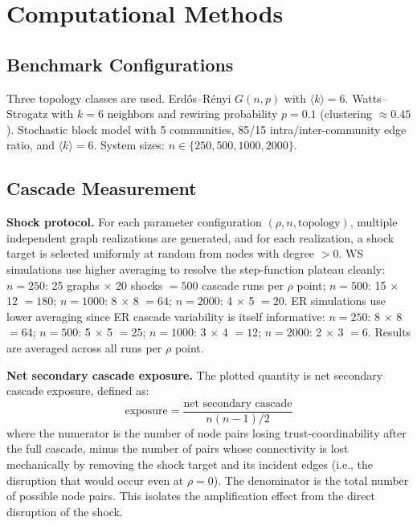\documentclass[11pt,a4paper]{article}
\begin{document}
\appendix

\section{Computational Methods}

\subsection{Benchmark Configurations}

Three topology classes are used. Erd\H{o}s--R\'enyi $G(n,p)$ with $\langle k \rangle = 6$. Watts--Strogatz with $k = 6$ neighbors and rewiring probability $p = 0.1$ (clustering $\approx 0.45$). Stochastic block model with 5 communities, 85/15 intra/inter-community edge ratio, and $\langle k \rangle = 6$. System sizes: $n \in \{250, 500, 1000, 2000\}$.

\subsection{Cascade Measurement}

\textbf{Shock protocol.} For each parameter configuration $(\rho, n, \text{topology})$, multiple independent graph realizations are generated, and for each realization, a shock target is selected uniformly at random from nodes with degree $> 0$. WS simulations use higher averaging to resolve the step-function plateau cleanly: $n = 250$: 25 graphs $\times$ 20 shocks $= 500$ cascade runs per $\rho$ point; $n = 500$: 15 $\times$ 12 $= 180$; $n = 1000$: 8 $\times$ 8 $= 64$; $n = 2000$: 4 $\times$ 5 $= 20$. ER simulations use lower averaging since ER cascade variability is itself informative: $n = 250$: 8 $\times$ 8 $= 64$; $n = 500$: 5 $\times$ 5 $= 25$; $n = 1000$: 3 $\times$ 4 $= 12$; $n = 2000$: 2 $\times$ 3 $= 6$. Results are averaged across all runs per $\rho$ point.

\textbf{Net secondary cascade exposure.} The plotted quantity is net secondary cascade exposure, defined as:
\begin{equation*}
\text{exposure} = \frac{\text{net secondary cascade}}{n(n-1)/2}
\end{equation*}
where the numerator is the number of node pairs losing trust-coordinability after the full cascade, minus the number of pairs whose connectivity is lost mechanically by removing the shock target and its incident edges (i.e., the disruption that would occur even at $\rho = 0$). The denominator is the total number of possible node pairs. This isolates the amplification effect from the direct disruption of the shock.
\end{document}
